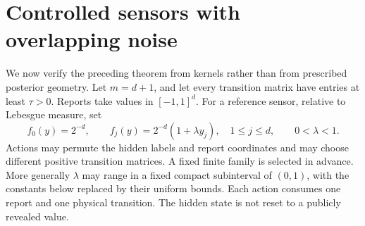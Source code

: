 \section{Controlled sensors with overlapping noise}\label{sec:sensors}
We now verify the preceding theorem from kernels rather than from prescribed posterior geometry. Let $m=d+1$, and let every transition matrix have entries at least $\tau>0$. Reports take values in $[-1,1]^d$. For a reference sensor, relative to Lebesgue measure, set
\begin{equation}\label{eq:rawsensors}
 f_0(y)=2^{-d},\qquad f_j(y)=2^{-d}(1+\lambda y_j),
       \quad 1\le j\le d,\qquad 0<\lambda<1.
\end{equation}
Actions may permute the hidden labels and report coordinates and may choose different positive transition matrices. A fixed finite family is selected in advance. More generally $\lambda$ may range in a fixed compact subinterval of $(0,1)$, with the constants below replaced by their uniform bounds. Each action consumes one report and one physical transition. The hidden state is not reset to a publicly revealed value.


